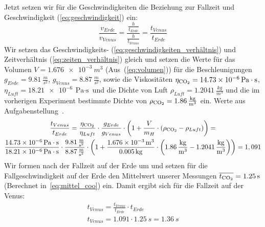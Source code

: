 \documentclass{article}
\begin{document}
          Jetzt setzen wir für die Geschwindigkeiten die Beziehung zur Fallzeit und Geschwindigkeit (\ref{eq:geschwindigkeit}) ein:
          \begin{equation}\label{eq:zeiten_verhältnis}
              \frac{ v_{Erde} }{ v_{Venus} } = \frac{ \frac{h}{t_{Erde}} }{ \frac{h}{t_{Venus}} } = \frac{t_{Venus}}{t_{Erde}}
          \end{equation}
          Wir setzen das Geschwindigkeits- (\ref{eq:geschwindigkeiten_verhältnis}) und Zeitverhältnis (\ref{eq:zeiten_verhältnis}) gleich und setzen die Werte
          für das Volumen \(V = \SI{1.676e-3}{m^3} \) (Aus~(\ref{eq:volumen}))
          für die Beschleunigungen \(g_{Erde} = \SI{9.81}{\frac{m}{s^2}} \), \(g_{Venus} = \SI{8.87}{\frac{m}{s^2}} \),
          sowie die Viskositäten \(\eta_{\ce{CO2}} = \SI{14.73e-6}{\pascal \cdot \second} \),  \(\eta_{Luft} = \SI{18.21e-6}{\pascal \cdot \second} \) und
          die Dichte von Luft \(\rho_{Luft} = \SI{1.2041}{\frac{kg}{m^3}}\) und die im vorherigen Experiment bestimmte
          Dichte von  \(\rho_{\ce{CO2}} = \SI{1.86}{\frac{kg}{m^3}} \) ein.
          Werte aus Aufgabenstellung~\cite{Aufgabenstellung}.
          \begin{equation}
              \begin{gathered}
                  \frac{t_{Venus}}{t_{Erde}} =
                  \frac{ \eta_{\ce{CO2}}}{ \eta_{Luft} } \cdot \frac{ g_{Erde} }{ g_{Venus} } \cdot \left( 1 + \frac{V}{m_H} \cdot \left( \rho_{\ce{CO2}} - \rho_{Luft} \right) \right) = \\
                  \frac{ \SI{14.73e-6}{\pascal \cdot \second} }{ \SI{18.21e-6}{\pascal \cdot \second} } \cdot
                  \frac{ \SI{9.81}{\frac{m}{s^2}} }{ \SI{8.87}{\frac{m}{s^2}} } \cdot
                  \left( 1 + \frac{ \SI{1.676e-3}{m^3} }{ \SI{0.005}{\kilogram} } \cdot \left( \SI{1.86}{\frac{kg}{m^3}} - \SI{1.2041}{\frac{kg}{m^3}} \right) \right)
                  = 1,091
              \end{gathered}
          \end{equation}
          Wir formen nach der Fallzeit auf der Erde um und setzen für die Fallgeschwindigkeit auf der Erde
          den Mittelwert unserer Messungen \( \overline{t_{\ce{CO2}}} = \SI{1.25}{s} \) (Berechnet in~\ref{eq:mittel_coo}) ein.
          Damit ergibt sich für die Fallzeit auf der Venus:
          \begin{equation}
              \begin{gathered}
                  t_{Venus} = \frac{t_{Venus}}{t_{Erde}} \cdot t_{Erde} \\
                  t_{Venus} = 1.091 \cdot \SI{1.25}{s} = \SI{1.36}{s}
              \end{gathered}
          \end{equation}
\end{document}
